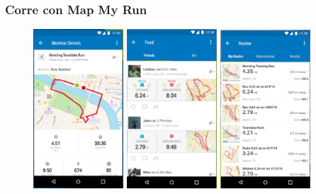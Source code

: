 \documentclass[a4paper, 11pt]{article}
\begin{document}
\begin{itemize}
                    \subsubsection{Corre con Map My Run}

                      \begin{figure}[h]
                          \centering
                          \includegraphics[width=0.3\textwidth]{mapmy1}
                          \includegraphics[width=0.3\textwidth]{mapmy2}
                          \includegraphics[width=0.3\textwidth]{mapmy3}

\end{figure}
\end{itemize}
\end{document}
